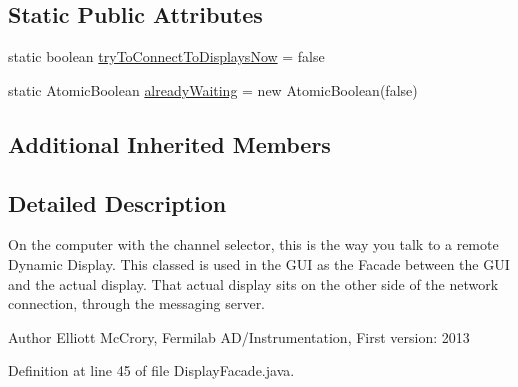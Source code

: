 \subsection*{Static Public Attributes}
\begin{DoxyCompactItemize}
\item 
static boolean \hyperlink{classgov_1_1fnal_1_1ppd_1_1dd_1_1display_1_1DisplayFacade_a0e46150fb1f40a87bac5060ea85c6dcc}{try\-To\-Connect\-To\-Displays\-Now} = false
\item 
static Atomic\-Boolean \hyperlink{classgov_1_1fnal_1_1ppd_1_1dd_1_1display_1_1DisplayFacade_a385e34731c409e71b2cea39b88b7e918}{already\-Waiting} = new Atomic\-Boolean(false)
\end{DoxyCompactItemize}
\subsection*{Additional Inherited Members}


\subsection{Detailed Description}
On the computer with the channel selector, this is the way you talk to a remote Dynamic Display. This classed is used in the G\-U\-I as the Facade between the G\-U\-I and the actual display. That actual display sits on the other side of the network connection, through the messaging server.

\begin{DoxyAuthor}{Author}
Elliott Mc\-Crory, Fermilab A\-D/\-Instrumentation, First version\-: 2013 
\end{DoxyAuthor}


Definition at line 45 of file Display\-Facade.\-java.



